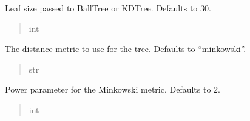 \documentclass[letterpaper,10pt,english]{sphinxmanual}
\begin{document}
\begin{fulllineitems}
\begin{fulllineitems}
\label{\detokenize{application.algorithms.knn:application.algorithms.knn.KnnConfiguration.KnnConfiguration.leaf_size}}
\pysigstartsignatures
{}
\pysigstopsignatures
\sphinxAtStartPar
Leaf size passed to BallTree or KDTree. Defaults to 30.
\begin{quote}\begin{description}
\sphinxAtStartPar
int

\end{description}\end{quote}

\end{fulllineitems}


\begin{fulllineitems}
\label{\detokenize{application.algorithms.knn:application.algorithms.knn.KnnConfiguration.KnnConfiguration.metric}}
\pysigstartsignatures
{}
\pysigstopsignatures
\sphinxAtStartPar
The distance metric to use for the tree. Defaults to “minkowski”.
\begin{quote}\begin{description}
\sphinxAtStartPar
str

\end{description}\end{quote}

\end{fulllineitems}


\begin{fulllineitems}
\label{\detokenize{application.algorithms.knn:application.algorithms.knn.KnnConfiguration.KnnConfiguration.p}}
\pysigstartsignatures
{}
\pysigstopsignatures
\sphinxAtStartPar
Power parameter for the Minkowski metric. Defaults to 2.
\begin{quote}\begin{description}
\sphinxAtStartPar
int


\end{description}
\end{quote}
\end{fulllineitems}
\end{fulllineitems}
\end{document}
